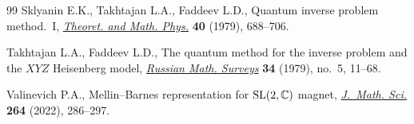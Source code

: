 \begin{thebibliography}{99}
Sklyanin E.K., Takhtajan L.A., Faddeev L.D., Quantum inverse problem
 method.~{I}, \href{https://doi.org/10.1007/BF01018718}{\textit{Theoret. and
 Math. Phys.}} \textbf{40} (1979), 688--706.

Takhtajan L.A., Faddeev L.D., The quantum method for the inverse problem and
 the {$XYZ$} {H}eisenberg model,
 \href{https://doi.org/10.1070/RM1979v034n05ABEH003909}{\textit{Russian Math.
 Surveys}} \textbf{34} (1979), no.~5, 11--68.

Valinevich P.A., Mellin--{B}arnes representation for {${\rm SL}(2,\mathbb{C})$}
 magnet, \href{https://doi.org/10.1007/s10958-022-05999-2}{\textit{J.~Math.
 Sci.}} \textbf{264} (2022), 286--297.

\end{thebibliography}
